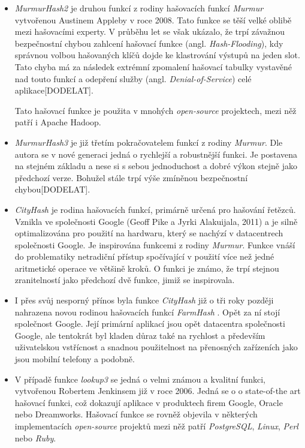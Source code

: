 \begin{itemize}
	\item \textit{MurmurHash2} \cite{murmurhash2} je druhou funkcí z rodiny hašovacích funkcí \textit{Murmur} vytvořenou
		Austinem Appleby v roce 2008. Tato funkce se těší velké oblibě mezi hašovacími experty. V průběhu let se však 
		ukázalo, že trpí závažnou bezpečnostní chybou zahlcení hašovací funkce (angl. \textit{Hash-Flooding}), kdy správnou
		volbou hašovaných klíčů dojde ke klastrování výstupů na jeden slot. Tato chyba má za následek extrémní zpomalení 
		hašovací tabulky vystavěné nad touto funkcí a odepření služby (angl. \textit{Denial-of-Service}) celé aplikace[DODELAT]. 
		
		Tato hašovací funkce je použita v mnohých \textit{open-source} projektech, mezi něž patří i Apache Hadoop. 
		
	\item \textit{MurmurHash3} \cite{murmurhash3} je již třetím pokračovatelem funkcí z rodiny \textit{Murmur}. Dle
		autora se v nové generaci jedná o rychlejší a robustnější funkci. Je postavena na stejném základu a nese si 
		s sebou jednoduchost a dobré výkon stejně jako předchozí verze. Bohužel stále trpí výše zmíněnou bezpečnostní
		chybou[DODELAT].
	
	\item \textit{CityHash} \cite{cityhash_slides} je rodina hašovacích funkcí, primárně určená pro hašování řetězců. 
		Vznikla ve společnosti Google (Geoff Pike a  Jyrki Alakuijala, 2011) a je silně optimalizována pro použití na
		hardwaru, který se nachýzí v datacentrech
		společnosti Google. Je inspirována funkcemi z rodiny \textit{Murmur}. Funkce vnáší do problematiky
		netradiční přístup spočívající v použití více než jedné aritmetické operace ve většině kroků. O funkci je známo,
		že trpí stejnou zranitelností jako předchozí dvě funkce, jimiž se inspirovala.
	
	\item I přes svůj nesporný přínos byla funkce \textit{CityHash} již o tři roky později nahrazena novou rodinou
		hašovacích funkcí \textit{FarmHash} \cite{farmhash} \cite{Simone2014}. Opět za ní stojí společnost Google. Její primární aplikací
		jsou opět datacentra společnosti Google, ale tentokrát byl kladen důraz také na rychlost a především
		uživatelskou vstřícnost a snadnou použitelnost na přenosných zařízeních jako jsou mobilní telefony a podobně.
	
	\item V případě funkce \textit{lookup3} \cite{NCHF_auto_design} se jedná o velmi známou a kvalitní funkci, vytvořenou Robertem Jenkinsem
		již v roce 2006. Jedná se o o state-of-the art hašovací funkci, což dokazují aplikace v produktech firem
		Google, Oracle nebo Dreamworks. Hašovací funkce se rovněž objevila v některých implementacích \textit{open-source}
		projektů mezi něž patří \textit{PostgreSQL}, \textit{Linux}, \textit{Perl} nebo \textit{Ruby}.
	

\end{itemize}

